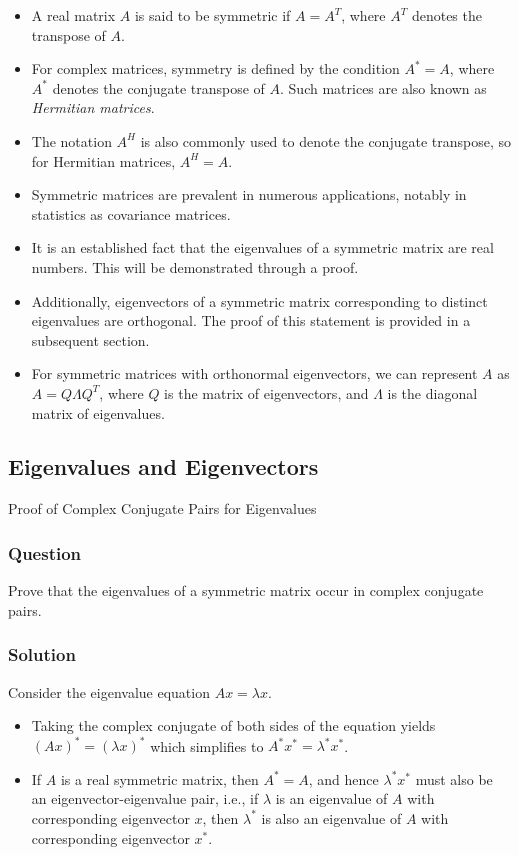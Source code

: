 \begin{itemize}
    \item A real matrix \( A \) is said to be symmetric if \( A = A^T \), where \( A^T \) denotes the transpose of \( A \).
    \item For complex matrices, symmetry is defined by the condition \( A^* = A \), where \( A^* \) denotes the conjugate transpose of \( A \). Such matrices are also known as \textit{Hermitian matrices}.
    \item The notation \( A^H \) is also commonly used to denote the conjugate transpose, so for Hermitian matrices, \( A^H = A \).
    \item Symmetric matrices are prevalent in numerous applications, notably in statistics as covariance matrices.
    \item It is an established fact that the eigenvalues of a symmetric matrix are real numbers. This will be demonstrated through a proof.
    \item Additionally, eigenvectors of a symmetric matrix corresponding to distinct eigenvalues are orthogonal. The proof of this statement is provided in a subsequent section.
    \item For symmetric matrices with orthonormal eigenvectors, we can represent \( A \) as \( A = Q\Lambda Q^T \), where \( Q \) is the matrix of eigenvectors, and \( \Lambda \) is the diagonal matrix of eigenvalues.
\end{itemize}

\subsection*{Eigenvalues and Eigenvectors}
\begin{examplebox}{Proof of Complex Conjugate Pairs for Eigenvalues}
\subsubsection*{Question}

Prove that the eigenvalues of a symmetric matrix occur in complex conjugate pairs.

\subsubsection*{Solution}

Consider the eigenvalue equation \( Ax = \lambda x \).

\begin{itemize}
    \item Taking the complex conjugate of both sides of the equation yields \( (Ax)^* = (\lambda x)^* \) which simplifies to \( A^* x^* = \lambda^* x^* \).
    \item If \( A \) is a real symmetric matrix, then \( A^* = A \), and hence \( \lambda^* x^* \) must also be an eigenvector-eigenvalue pair, i.e., if \( \lambda \) is an eigenvalue of \( A \) with corresponding eigenvector \( x \), then \( \lambda^* \) is also an eigenvalue of \( A \) with corresponding eigenvector \( x^* \).
\end{itemize}

\end{examplebox}

